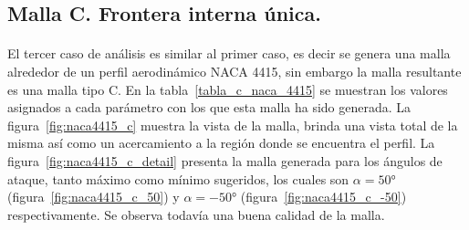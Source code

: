 \documentclass[letterpaper, openright, 12pt]{book}
\begin{document}
    \subsection{Malla C. Frontera interna única.}
    \paragraph*{}
    El tercer caso de análisis es similar al primer caso, es decir se genera
    una malla alrededor de un perfil aerodinámico NACA 4415, sin embargo la
    malla resultante es una malla tipo C. En la tabla~\ref{tabla_c_naca_4415}
    se muestran los valores asignados a cada parámetro con los que esta malla
    ha sido generada. La figura~\ref{fig:naca4415_c} muestra la vista de la
    malla, brinda una vista total de la misma así como un acercamiento a la
    región donde se encuentra el perfil. La figura~\ref{fig:naca4415_c_detail}
    presenta la malla generada para los ángulos de ataque, tanto
    máximo como mínimo sugeridos, los cuales son $\alpha =
    50\si{\degree}$ (figura~\ref{fig:naca4415_c_50}) y
    $\alpha = -50\si{\degree}$ (figura~\ref{fig:naca4415_c_-50}) respectivamente. Se observa todavía una buena
    calidad de la malla.
\end{document}
